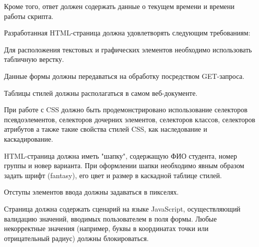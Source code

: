 \documentclass{article}
\begin{document}
Кроме того, ответ должен содержать данные о текущем времени и времени работы скрипта.


Разработанная HTML-страница должна удовлетворять следующим требованиям:


Для расположения текстовых и графических элементов необходимо использовать табличную верстку.


Данные формы должны передаваться на обработку посредством GET-запроса.


Таблицы стилей должны располагаться в самом веб-документе.


При работе с CSS должно быть продемонстрировано использование селекторов псевдоэлементов, селекторов дочерних элементов, селекторов классов, селекторов атрибутов а также такие свойства стилей CSS, как наследование и каскадирование.


HTML-страница должна иметь "шапку", содержащую ФИО студента, номер группы и новер варианта. При оформлении шапки необходимо явным образом задать шрифт (fantasy), его цвет и размер в каскадной таблице стилей.


Отступы элементов ввода должны задаваться в пикселях.


Страница должна содержать сценарий на языке JavaScript, осуществляющий валидацию значений, вводимых пользователем в поля формы. Любые некорректные значения (например, буквы в координатах точки или отрицательный радиус) должны блокироваться.
\end{document}
